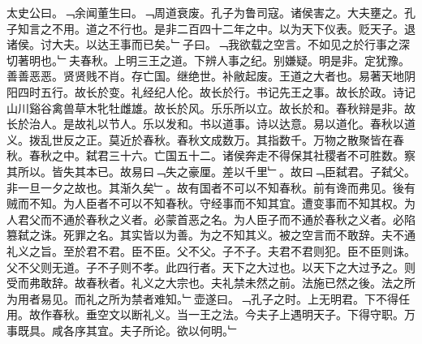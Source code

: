 \documentclass{zhvt-classic}
\begin{document}
\hspace*{2em}太史公曰。﹁余闻董生曰。﹁周道衰废。孔子为鲁司寇。诸侯害之。大夫壅之。孔子知言之不用。道之不行也。是非二百四十二年之中。以为天下仪表。贬天子。退诸侯。讨大夫。以达王事而已矣。﹂子曰。﹁我欲载之空言。不如见之於行事之深切著明也。﹂夫春秋。上明三王之道。下辨人事之纪。别嫌疑。明是非。定犹豫。善善恶恶。贤贤贱不肖。存亡国。继绝世。补敝起废。王道之大者也。易著天地阴阳四时五行。故长於变。礼经纪人伦。故长於行。书记先王之事。故长於政。诗记山川谿谷禽兽草木牝牡雌雄。故长於风。乐乐所以立。故长於和。春秋辩是非。故长於治人。是故礼以节人。乐以发和。书以道事。诗以达意。易以道化。春秋以道义。拨乱世反之正。莫近於春秋。春秋文成数万。其指数千。万物之散聚皆在春秋。春秋之中。弑君三十六。亡国五十二。诸侯奔走不得保其社稷者不可胜数。察其所以。皆失其本已。故易曰﹁失之豪厘。差以千里﹂。故曰﹁臣弑君。子弑父。非一旦一夕之故也。其渐久矣﹂。故有国者不可以不知春秋。前有谗而弗见。後有贼而不知。为人臣者不可以不知春秋。守经事而不知其宜。遭变事而不知其权。为人君父而不通於春秋之义者。必蒙首恶之名。为人臣子而不通於春秋之义者。必陷篡弑之诛。死罪之名。其实皆以为善。为之不知其义。被之空言而不敢辞。夫不通礼义之旨。至於君不君。臣不臣。父不父。子不子。夫君不君则犯。臣不臣则诛。父不父则无道。子不子则不孝。此四行者。天下之大过也。以天下之大过予之。则受而弗敢辞。故春秋者。礼义之大宗也。夫礼禁未然之前。法施已然之後。法之所为用者易见。而礼之所为禁者难知。﹂壶遂曰。﹁孔子之时。上无明君。下不得任用。故作春秋。垂空文以断礼义。当一王之法。今夫子上遇明天子。下得守职。万事既具。咸各序其宜。夫子所论。欲以何明。﹂\\
\end{document}
